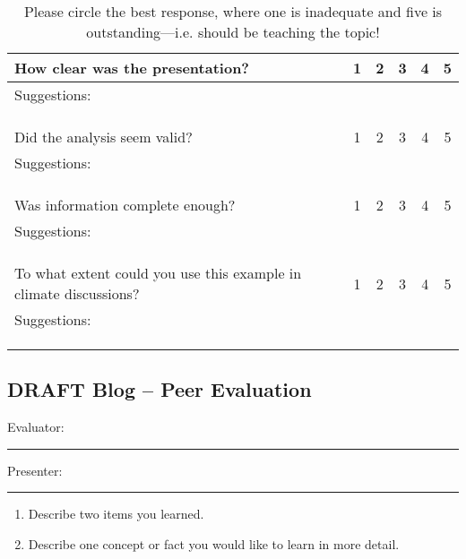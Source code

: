 \documentclass{article}\usepackage[]{graphicx}\usepackage[]{color}
\begin{document}
\begin{table}[ht!]
\caption{Please circle the best response, where one is inadequate and five is outstanding---i.e. should be teaching the topic!}
\begin{tabular}{|p{4in}|ccccc|}\hline
How clear was the presentation?     & 1 & 2 & 3 & 4 & 5 \\ \hline
Suggestions: &&&&& \\ &&&&& \\ &&&&& \\
&&&&& \\ \hline
Did the analysis seem valid?        & 1 & 2 & 3 & 4 & 5 \\ \hline
Suggestions: &&&&& \\ &&&&& \\ &&&&& \\
&&&&& \\ \hline
Was information complete enough?            & 1 & 2 & 3 & 4 & 5 \\ \hline
Suggestions: &&&&& \\ &&&&& \\ &&&&& \\
&&&&& \\ \hline
To what extent could you use this example in climate discussions?            & 1 & 2 & 3 & 4 & 5 \\ \hline
Suggestions: &&&&& \\ &&&&& \\ &&&&& \\
&&&&& \\ \hline
\end{tabular}
\end{table}

\clearpage
\newpage
\subsection{DRAFT Blog -- Peer Evaluation}

\bigskip
Evaluator: \rule{7cm}{0.4pt}

\bigskip

\noindent Presenter: \rule{7cm}{0.4pt}

\begin{enumerate}
 \setlength\itemsep{4em}
  \item Describe two items you learned.
  \item Describe one concept or fact you would like to learn in more detail.
\end{enumerate}
\end{document}
